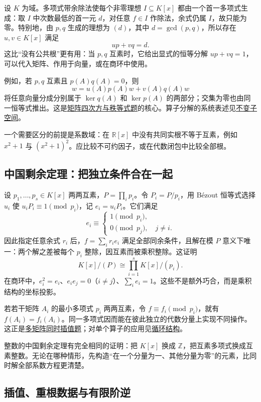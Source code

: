 \documentclass[UTF8,12pt,a4paper,fontset=fandol]{ctexart}
\begin{document}
\label{app:algebra-bezout}

设 $K$ 为域。多项式带余除法使每个非零理想 $I\subseteq K[x]$ 都由一个首一多项式生成：取 $I$ 中次数最低的首一元 $d$，对任意 $f\in I$ 作除法，余式仍属 $I$，故只能为零。特别地，由 $p,q$ 生成的理想为 $(d)$，其中 $d=\gcd(p,q)$，所以存在 $u,v\in K[x]$ 满足
\[
up+vq=d.
\]
这比“没有公共根”更有用：当 $p,q$ 互素时，它给出显式的恒等分解 $up+vq=1$，可以代入矩阵、作用于向量，或在商环中使用。

例如，若 $p,q$ 互素且 $p(A)q(A)=0$，则
\[
w=u(A)p(A)w+v(A)q(A)w
\]
将任意向量分成分别属于 $\ker q(A)$ 和 $\ker p(A)$ 的两部分；交集为零也由同一恒等式推出。这是\hyperref[pr:fin15-high:6]{矩阵四次方与秩等式题}的核心。算子分解的系统表述见\hyperref[app:linear-invariant]{不变子空间}。

一个需要区分的前提是系数域：在 $\mathbb R[x]$ 中没有共同实根不等于互素，例如 $x^2+1$ 与 $(x^2+1)^2$。应比较不可约因子，或在代数闭包中比较全部根。

\subsection{中国剩余定理：把独立条件合在一起}

\label{app:algebra-crt}

设 $p_1,\ldots,p_s\in K[x]$ 两两互素，$P=\prod_i p_i$。令 $P_i=P/p_i$，用 Bézout 恒等式选择 $u_i$ 使 $u_iP_i\equiv1\pmod{p_i}$，记 $e_i=u_iP_i$。它们满足
\[
e_i\equiv\begin{cases}1\pmod{p_i},\\0\pmod{p_j},\quad j\ne i.\end{cases}
\]
因此指定任意余式 $r_i$ 后，$f=\sum_i r_ie_i$ 满足全部同余条件，且解在模 $P$ 意义下唯一：两个解之差被每个 $p_i$ 整除，因互素而被乘积整除。这证明
\[
K[x]/(P)\cong\prod_{i=1}^sK[x]/(p_i).
\]
在商环中，$e_i^2=e_i$、$e_ie_j=0$（$i\ne j$）、$\sum_i e_i=1$。这些不是额外巧合，而是乘积结构的坐标投影。

若若干矩阵 $A_i$ 的最小多项式 $p_i$ 两两互素，令 $f\equiv f_i\pmod{p_i}$，就有 $f(A_i)=f_i(A_i)$。同一多项式因而能在彼此独立的代数分量上实现不同操作。这正是\hyperref[pr:ch06-14th-A-makeup2:3]{多矩阵同时插值题}；对单个算子的应用见\hyperref[app:linear-cyclic]{循环结构}。

整数的中国剩余定理有完全相同的证明：把 $K[x]$ 换成 $\mathbb Z$，把互素多项式换成互素整数。无论在哪种情形，先构造“在一个分量为一、其他分量为零”的元素，比同时解全部系数方程更清楚。

\subsection{插值、重根数据与有限阶逆}
\end{document}
